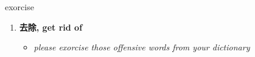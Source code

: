 
\begin{frame}
{\huge exorcise}
\begin{center}
\begin{enumerate}\Large
  \item \textbf{去除, get rid of}
  \begin{itemize}
    \item \em{\Large{please exorcise those offensive words from your dictionary}}
  \end{itemize}
\end{enumerate}
\end{center}
\end{frame}
